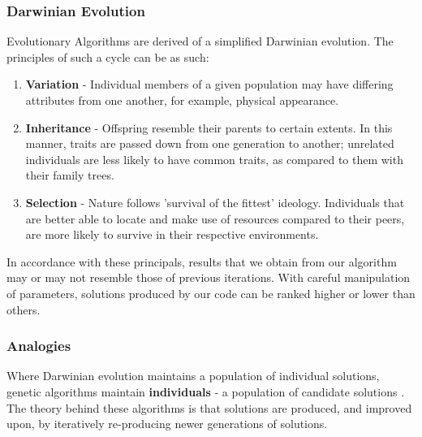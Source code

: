 \documentclass[conference,compsoc]{IEEEtran}
\begin{document}
\subsubsection{Darwinian Evolution}
Evolutionary Algorithms are derived of a simplified Darwinian evolution. The principles of such a cycle can be as such:
\begin{enumerate}
    \item \textbf{Variation} - Individual members of a given population may have differing attributes 
    from one another, for example, physical appearance.
    \item \textbf{Inheritance} - Offspring resemble their parents to certain extents. 
    In this manner, traits are passed down from one generation to another; unrelated individuals are less likely to have common traits, as 
    compared to them with their family trees.
    \item \textbf{Selection} - Nature follows 'survival of the fittest' ideology. Individuals that 
    are better able to locate and make use of resources compared to their peers, are more likely to survive in their respective environments. 
\end{enumerate}
In accordance with these principals, results that we obtain from our algorithm may or may not resemble those of 
previous iterations. With careful manipulation of parameters, solutions produced by our code can be ranked 
higher or lower than others.
\subsubsection{Analogies}
Where Darwinian evolution maintains a population of individual solutions, genetic algorithms maintain 
\textbf{individuals} - a population of candidate solutions \cite{Wiransky-GA}. The theory behind these 
algorithms is that solutions are produced, and improved upon, by iteratively re-producing newer generations of solutions.
\end{document}
